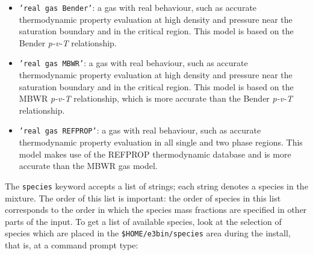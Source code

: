 \documentclass[12pt,a4paper,twoside]{article}
\begin{document}
\begin{itemize}
 \item \texttt{'real gas Bender'}: a gas with real behaviour, such as accurate thermodynamic property evaluation
                            at high density and pressure near the saturation boundary and in the critical region.
                            This model is based on the Bender \textit{p-v-T} relationship.
 \item \texttt{'real gas MBWR'}: a gas with real behaviour, such as accurate thermodynamic property evaluation
                            at high density and pressure near the saturation boundary and in the critical region.
                            This model is based on the MBWR \textit{p-v-T} relationship, which is more accurate
                            than the Bender \textit{p-v-T} relationship.
 \item \texttt{'real gas REFPROP'}: a gas with real behaviour, such as accurate thermodynamic property evaluation
                            in all single and two phase regions.
                            This model makes use of the REFPROP thermodynamic database and is more accurate than
                            the MBWR gas model.
\end{itemize}

The \texttt{species} keyword accepts a list of strings; each string denotes
a species in the mixture.  The order of this list is important: the order of
species in this list corresponds to the order in which the species mass fractions
are specified in other parts of the input.
To get a list of available species, look at the selection of species which are placed
in the \texttt{\$HOME/e3bin/species} area during the install, 
that is, at a command prompt type:
\end{document}
